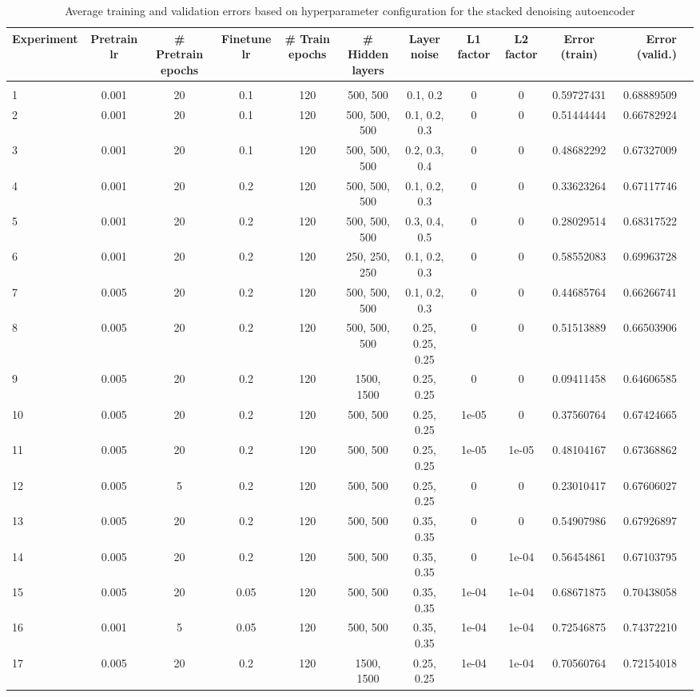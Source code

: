 \documentclass{acm_proc_article-sp}
\begin{document}
\newpage
\appendix
\label{appendix}
\begin{table}[h]
\caption{Average training and validation errors based on hyperparameter configuration for the stacked denoising autoencoder}
\label{tab:sda_params}
\begin{center}
\begin{adjustbox}{width=\textwidth}
\begin{tabular}{lccccccccc|rr|}

{\bf Experiment} & {\bf Pretrain lr} & {\bf \# Pretrain epochs}
&{\bf Finetune lr}
&{\bf \# Train epochs}
&{\bf \# Hidden layers}
&{\bf Layer noise}
&{\bf L1 factor}
&{\bf L2 factor}
&{\bf Error (train)}
&{\bf Error (valid.)}
\\ \hline \\	
1 & 0.001 & 20 & 0.1 & 120 & 500, 500 & 0.1, 0.2 & 0 & 0 & 0.59727431 & 0.68889509 \\
2 & 0.001 & 20 & 0.1 & 120 & 500, 500, 500 & 0.1, 0.2, 0.3 & 0 & 0 & 0.51444444 & 0.66782924 \\
3 & 0.001 & 20 & 0.1 & 120 & 500, 500, 500 & 0.2, 0.3, 0.4 & 0 & 0 & 0.48682292 & 0.67327009 \\
4& 0.001 & 20 & 0.2 & 120 & 500, 500, 500 & 0.1, 0.2, 0.3 & 0 & 0 & 0.33623264 & 0.67117746 \\
5 & 0.001 & 20 & 0.2 & 120 & 500, 500, 500 & 0.3, 0.4, 0.5 & 0 & 0 & 0.28029514 & 0.68317522 \\
6 & 0.001 & 20 & 0.2 & 120 & 250, 250, 250 & 0.1, 0.2, 0.3 & 0 & 0 & 0.58552083 & 0.69963728 \\
7 & 0.005 & 20 & 0.2 & 120 & 500, 500, 500 & 0.1, 0.2, 0.3 & 0 & 0 & 0.44685764 & 0.66266741 \\
8 & 0.005 & 20 & 0.2 & 120 & 500, 500, 500 & 0.25, 0.25, 0.25 & 0 & 0 & 0.51513889 & 0.66503906 \\
9 & 0.005 & 20 & 0.2 & 120 & 1500, 1500 & 0.25, 0.25 & 0 & 0 & 0.09411458 & 0.64606585 \\
10 & 0.005 & 20 & 0.2 & 120 & 500, 500 & 0.25, 0.25 & 1e-05 & 0 & 0.37560764 & 0.67424665 \\
11 & 0.005 & 20 & 0.2 & 120 & 500, 500 & 0.25, 0.25 & 1e-05 & 1e-05 & 0.48104167 & 0.67368862 \\
12 & 0.005 & 5 & 0.2 & 120 & 500, 500 & 0.25, 0.25 & 0 & 0 & 0.23010417 & 0.67606027 \\
13 & 0.005 & 20 & 0.2 & 120 & 500, 500 & 0.35, 0.35 & 0 & 0 & 0.54907986 & 0.67926897 \\
14 & 0.005 & 20 & 0.2 & 120 & 500, 500 & 0.35, 0.35 & 0 & 1e-04 & 0.56454861 & 0.67103795 \\
15 & 0.005 & 20 & 0.05 & 120 & 500, 500 & 0.35, 0.35 & 1e-04 & 1e-04 & 0.68671875 & 0.70438058 \\
16 & 0.001 & 5 & 0.05 & 120 & 500, 500 & 0.35, 0.35 & 1e-04 & 1e-04 & 0.72546875 & 0.74372210 \\
17 & 0.005 & 20 & 0.2 & 120 & 1500, 1500 & 0.25, 0.25 & 1e-04 & 1e-04 & 0.70560764 & 0.72154018 \\ 

\end{tabular}
\end{adjustbox}
\end{center}
\end{table}
\end{document}
